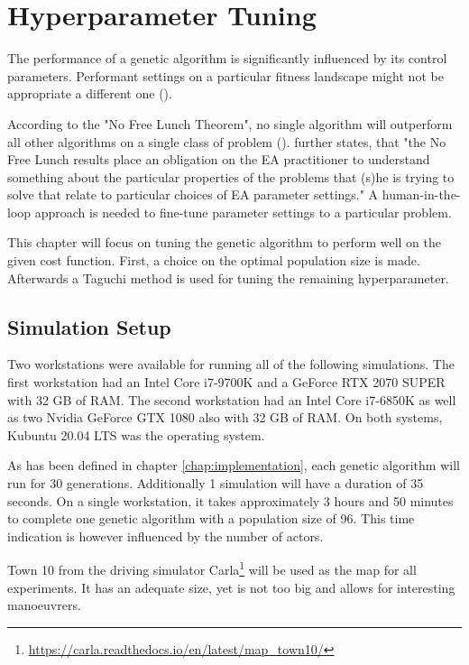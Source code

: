 \chapter{Hyperparameter Tuning}
\label{chap:hyperparameter_tuning}
The performance of a genetic algorithm is significantly influenced by its control parameters. Performant settings on a particular fitness landscape might not be appropriate a different one (\cite{kacprzyk_parameter_2007}).

According to the "No Free Lunch Theorem", no single algorithm will outperform all other algorithms on a single class of problem (\cite{kacprzyk_parameter_2007}). \cite{kacprzyk_parameter_2007} further states, that "the No Free Lunch results place an obligation on the EA practitioner to understand something about the particular properties of the problems that (s)he is trying to solve that relate to particular choices of EA parameter settings."
A human-in-the-loop approach is needed to fine-tune parameter settings to a particular problem.

This chapter will focus on tuning the genetic algorithm to perform well on the given cost function. First, a choice on the optimal population size is made. Afterwards a Taguchi method is used for tuning the remaining hyperparameter.

\section{Simulation Setup}
\label{sect:hyperparameter_tuning:simulation_setup}
Two workstations were available for running all of the following simulations. The first workstation had an Intel Core i7-9700K and a GeForce RTX 2070 SUPER with 32 GB of RAM. The second workstation had an Intel Core i7-6850K as well as two Nvidia GeForce GTX 1080 also with 32 GB of RAM. On both systems, Kubuntu 20.04 LTS was the operating system.

As has been defined in chapter \ref{chap:implementation}, each genetic algorithm will run for 30 generations. Additionally 1 simulation will have a duration of 35 seconds. On a single workstation, it takes approximately 3 hours and 50 minutes to complete one genetic algorithm with a population size of 96. This time indication is however influenced by the number of actors. 

Town 10 from the driving simulator Carla\footnote{\href{https://carla.readthedocs.io/en/latest/map_town10/}{https://carla.readthedocs.io/en/latest/map\_town10/}} will be used as the map for all experiments. It has an adequate size, yet is not too big and allows for interesting manoeuvrers.

